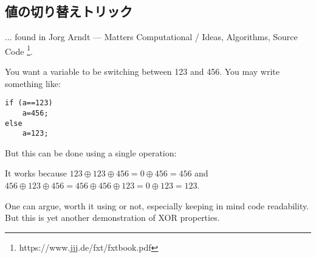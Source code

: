 \subsection{値の切り替えトリック}

... found in Jorg Arndt --- Matters Computational / Ideas, Algorithms, Source Code
\footnote{https://www.jjj.de/fxt/fxtbook.pdf}.

You want a variable to be switching between 123 and 456.
You may write something like:

\begin{lstlisting}
if (a==123)
    a=456;
else
    a=123;
\end{lstlisting}

But this can be done using a single operation:



It works because $123 \oplus 123 \oplus 456=0 \oplus 456=456$ and
$456 \oplus 123 \oplus 456=456 \oplus 456 \oplus 123=0 \oplus 123=123$.

One can argue, worth it using or not, especially keeping in mind code readability.
But this is yet another demonstration of XOR properties.

